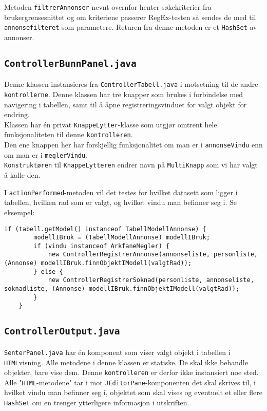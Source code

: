 Metoden \texttt{filtrerAnnonser} nevnt overnfor henter søkekriterier fra brukergrensesnittet og om kriteriene passerer RegEx-testen så sendes de med til \texttt{annonsefilteret} som parametere. Returen fra denne metoden er et \texttt{HashSet} av annonser.


\subsection{\texttt{ControllerBunnPanel.java}}
Denne klassen instansieres fra \texttt{ControllerTabell.java} i motsetning til de andre \texttt{kontrollerne}. Denne klassen har tre knapper som brukes i forbindelse med navigering i tabellen, samt til å åpne registreringsvinduet for valgt objekt for endring. \\
Klassen har én privat \texttt{KnappeLytter}-klasse som utgjør omtrent hele funksjonaliteten til denne \texttt{kontrolleren}. \\
Den ene knappen her har forskjellig funksjonalitet om man er i \texttt{annonseVindu} enn om man er i \texttt{meglerVindu}. \\
\texttt{Konstruktøren} til \texttt{KnappeLytteren} endrer navn på \texttt{MultiKnapp} som vi har valgt å kalle den. 

I \texttt{actionPerformed}-metoden vil det testes for hvilket datasett som ligger i tabellen, hvilken rad som er valgt, og hvilket vindu man befinner seg i. Se eksempel:

\begin{lstlisting}[caption=Utdrag fra \texttt{actionPerformed}-metoden i \texttt{ControllerBunnPanel.java}]
    if (tabell.getModel() instanceof TabellModellAnnonse) {
        modellIBruk = (TabellModellAnnonse) modellIBruk;
        if (vindu instanceof ArkfaneMegler) {
            new ControllerRegistrerAnnonse(annonseliste, personliste, (Annonse) modellIBruk.finnObjektIModell(valgtRad));
        } else {
            new ControllerRegistrerSoknad(personliste, annonseliste, soknadliste, (Annonse) modellIBruk.finnObjektIModell(valgtRad));
        }
    }
\end{lstlisting}

\subsection{\texttt{ControllerOutput.java}}
\texttt{SenterPanel.java} har én komponent som viser valgt objekt i tabellen i \texttt{HTML}visning. Alle metodene i denne klassen er statiske. De skal ikke behandle objekter, bare vise dem. Denne \texttt{kontrolleren} er derfor ikke instansiert noe sted. \\
Alle "\texttt{HTML}-metodene" tar i mot \texttt{JEditorPane}-komponenten det skal skrives til, i hvilket vindu man befinner seg i, objektet som skal vises og eventuelt et eller flere \texttt{HashSet} om en trenger ytterligere informasjon i utskriften.

